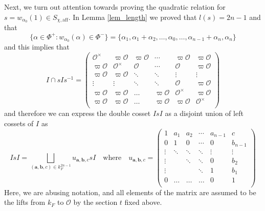 \documentclass{article}
\newcommand{\aff}{\mathrm{aff}}
\newcommand{\cO}{\mathcal{O}}
\theoremstyle{plain}
\theoremstyle{definition}
\begin{document}
    \newpage
    Next, we turn out attention towards proving the quadratic relation for $s=w_{\alpha_0}(1)\in S_{\chi,\aff}$. In Lemma \ref{lem_length} we proved that $l(s)=2n-1$ and that 
    $$\{\alpha\in\Phi^+:w_{\alpha_0}(\alpha)\in\Phi^-\}=\{\alpha_1,\alpha_1+\alpha_2,\ldots,\alpha_0,\ldots,\alpha_{n-1}+\alpha_n,\alpha_n\}$$
    and this implies that
    \begin{equation*}
        I\cap sI s^{-1}=\begin{pmatrix}
            \cO^\times&\varpi\cO&\varpi\cO&\cdots&\varpi\cO&\varpi\cO\\
            \varpi\cO&\cO^\times&\cO&\cdots&\cO&\varpi\cO\\
            \varpi\cO&\varpi\cO&\ddots&\ddots&\vdots&\vdots\\
            \vdots&\vdots&\ddots&\ddots&\cO&\varpi\cO\\
            \varpi\cO&\varpi\cO&\ldots&\varpi\cO&\cO^\times&\varpi\cO\\
           \varpi\cO&\varpi\cO&\ldots&\varpi\cO&\varpi\cO&\cO^\times\\
        \end{pmatrix}
    \end{equation*}
    and therefore we can express the double cosset $IsI$ as a disjoint union of left cossets of $I$ as
    \begin{equation*}
        IsI=\bigsqcup_{(\mathbf{a},\mathbf{b},c)\in k_F^{2n-1}}u_{\mathbf{a},\mathbf{b},c}sI\quad\text{where}\quad u_{\mathbf{a},\mathbf{b},c}=\begin{pmatrix}
            1&a_1&a_2&\cdots&a_{n-1}&c\\
            0&1&0&\cdots&0&b_{n-1}\\
            \vdots&\ddots&\ddots&\ddots&\vdots&\vdots\\
            \vdots&&\ddots&\ddots&0&b_2\\
            \vdots&&&\ddots&1&b_1\\
            0&\ldots&\ldots&\ldots&0&1\\
        \end{pmatrix}
    \end{equation*}
    Here, we are abusing notation, and all elements of the matrix are assumed to be the lifts from $k_F$ to $\cO$ by the section $t$ fixed above.
\end{document}
